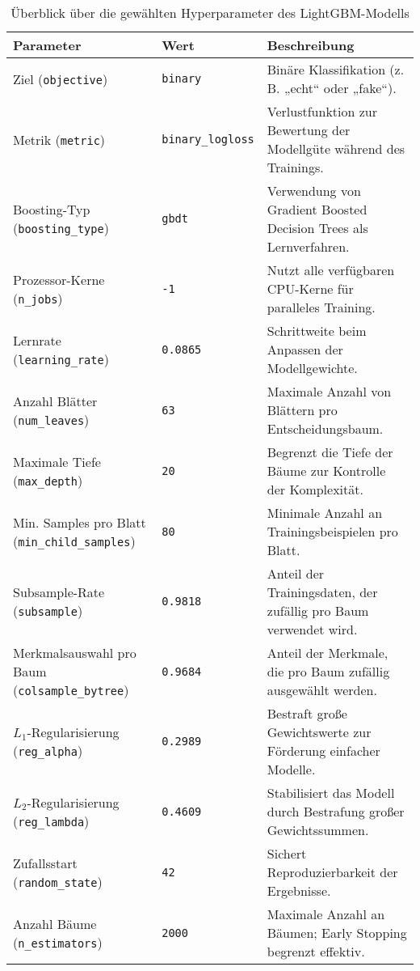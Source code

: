 \begin{table}[htbp]
    \centering
    \renewcommand{\arraystretch}{1.1}
    \begin{tabular}{|p{3cm}|l|p{7cm}|}
        \hline
        \rowcolor{lightgray} \textbf{Parameter} & \textbf{Wert} & \textbf{Beschreibung} \\
        \hline
        Ziel (\texttt{objective}) & \texttt{binary} & Binäre Klassifikation (z.\,B. „echt“ oder „fake“). \\
        \hline
        Metrik (\texttt{metric}) & \texttt{binary\_logloss} & Verlustfunktion zur Bewertung der Modellgüte während des Trainings. \\
        \hline
        Boosting-Typ (\texttt{boosting\_type}) & \texttt{gbdt} & Verwendung von Gradient Boosted Decision Trees als Lernverfahren. \\
        \hline
        Prozessor-Kerne (\texttt{n\_jobs}) & \texttt{-1} & Nutzt alle verfügbaren CPU-Kerne für paralleles Training. \\
        \hline
        Lernrate (\texttt{learning\_rate}) & \texttt{0.0865} & Schrittweite beim Anpassen der Modellgewichte. \\
        \hline
        Anzahl Blätter (\texttt{num\_leaves}) & \texttt{63} & Maximale Anzahl von Blättern pro Entscheidungsbaum. \\
        \hline
        Maximale Tiefe (\texttt{max\_depth}) & \texttt{20} & Begrenzt die Tiefe der Bäume zur Kontrolle der Komplexität. \\
        \hline
        Min. Samples pro Blatt (\texttt{min\_child\_samples}) & \texttt{80} & Minimale Anzahl an Trainingsbeispielen pro Blatt. \\
        \hline
        Subsample-Rate (\texttt{subsample}) & \texttt{0.9818} & Anteil der Trainingsdaten, der zufällig pro Baum verwendet wird. \\
        \hline
        Merkmalsauswahl pro Baum (\texttt{colsample\_bytree}) & \texttt{0.9684} & Anteil der Merkmale, die pro Baum zufällig ausgewählt werden. \\
        \hline
        $L_1$-Regularisierung (\texttt{reg\_alpha}) & \texttt{0.2989} & Bestraft große Gewichtswerte zur Förderung einfacher Modelle. \\
        \hline
        $L_2$-Regularisierung (\texttt{reg\_lambda}) & \texttt{0.4609} & Stabilisiert das Modell durch Bestrafung großer Gewichtssummen. \\
        \hline
        Zufallsstart (\texttt{random\_state}) & \texttt{42} & Sichert Reproduzierbarkeit der Ergebnisse. \\
        \hline
        Anzahl Bäume (\texttt{n\_estimators}) & \texttt{2000} & Maximale Anzahl an Bäumen; Early Stopping begrenzt effektiv. \\
        \hline
    \end{tabular}
    \caption{Überblick über die gewählten Hyperparameter des LightGBM-Modells}
    \label{tab:lightgbm-hyperparameter}
\end{table}